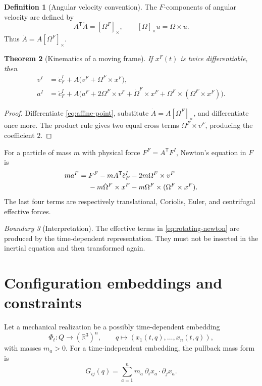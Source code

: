 \documentclass[11pt,a4paper]{article}
\theoremstyle{definition}
\newtheorem{definition}{Definition}[section]
\theoremstyle{plain}
\newtheorem{theorem}[definition]{Theorem}
\theoremstyle{remark}
\newtheorem{warning}[definition]{Boundary}
\newcommand{\R}{\mathbb{R}}
\newcommand{\crossop}[1]{\left[#1\right]_\times}
\begin{document}
\begin{definition}[Angular velocity convention]
The \(F\)-components of angular velocity are defined by
\[
A^{\mathsf T}\dot A=\crossop{\Omega^F},\qquad
\crossop{\Omega}u=\Omega\times u.
\]
Thus \(\dot A=A\crossop{\Omega^F}\).
\end{definition}

\begin{theorem}[Kinematics of a moving frame]\label{thm:frame-kinematics}
If \(x^F(t)\) is twice differentiable, then
\begin{align}
v^I&=\dot c_F^I+
A\bigl(v^F+\Omega^F\times x^F\bigr),\label{eq:velocity-map}\\
a^I&=\ddot c_F^I+
A\bigl(
a^F+2\Omega^F\times v^F+\dot\Omega^F\times x^F
+\Omega^F\times(\Omega^F\times x^F)
\bigr).\label{eq:acceleration-map}
\end{align}
\end{theorem}

\begin{proof}
Differentiate \cref{eq:affine-point}, substitute
\(\dot A=A\crossop{\Omega^F}\), and differentiate once more. The product
rule gives two equal cross terms
\(\Omega^F\times v^F\), producing the coefficient \(2\).
\end{proof}

For a particle of mass \(m\) with physical force
\(F^F=A^{\mathsf T}F^I\), Newton's equation in \(F\) is
\begin{align}
m a^F={}&F^F
-mA^{\mathsf T}\ddot c_F^I
-2m\Omega^F\times v^F \notag\\
&-m\dot\Omega^F\times x^F
-m\Omega^F\times(\Omega^F\times x^F).
\label{eq:rotating-newton}
\end{align}
The last four terms are respectively translational, Coriolis, Euler,
and centrifugal effective forces.

\begin{warning}[Interpretation]
The effective terms in \cref{eq:rotating-newton} are produced by the
time-dependent representation. They must not be inserted in the
inertial equation and then transformed again.
\end{warning}

\section{Configuration embeddings and constraints}

Let a mechanical realization be a possibly time-dependent embedding
\[
\Phi_t:Q\longrightarrow(\R^3)^n,\qquad
q\longmapsto(x_1(t,q),\ldots,x_n(t,q)),
\]
with masses \(m_a>0\). For a time-independent embedding, the pullback
mass form is
\begin{equation}\label{eq:mass-metric}
G_{ij}(q)=\sum_{a=1}^n
m_a\,\partial_i x_a\cdot\partial_j x_a.
\end{equation}
\end{document}
